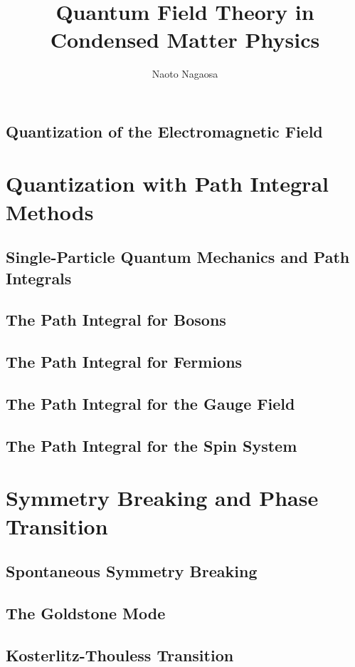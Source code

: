 \documentclass[twoside,11pt]{report}
\title{Quantum Field Theory in Condensed Matter Physics}
\author{Naoto Nagaosa}
\begin{document}
\maketitle
\tableofcontents
\setcounter{page}{0}








\section{Quantization of the Electromagnetic Field}

\chapter{Quantization with Path Integral Methods}
\section{Single-Particle Quantum Mechanics and Path Integrals}
\section{The Path Integral for Bosons}
\section{The Path Integral for Fermions}
\section{The Path Integral for the Gauge Field}
\section{The Path Integral for the Spin System}
\chapter{Symmetry Breaking and Phase Transition}
\section{Spontaneous Symmetry Breaking}
\section{The Goldstone Mode}
\section{Kosterlitz-Thouless Transition}
\end{document}
